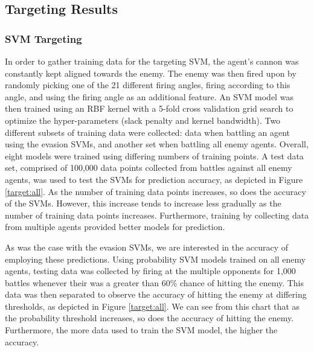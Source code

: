 \documentclass{article}
\theoremstyle{plain}
\theoremstyle{definition}
\theoremstyle{remark}
\begin{document}
\subsection*{Targeting Results}
\subsubsection*{SVM Targeting}
In order to gather training data for the targeting SVM, the agent's cannon was constantly kept aligned towards the enemy. The enemy was then fired upon by randomly picking one of the 21 different firing angles, firing according to this angle, and using the firing angle as an additional feature. An SVM model was then trained using an RBF kernel with a 5-fold cross validation grid search to optimize the hyper-parameters (slack penalty and kernel bandwidth). Two different subsets of training data were collected: data when battling an agent using the evasion SVMs, and another set when battling all enemy agents. Overall, eight models were trained using differing numbers of training points. A test data set, comprised of 100,000 data points collected from battles against all enemy agents, was used to test the SVMs for prediction accuracy, as depicted in Figure \ref{target:all}. As the number of training data points increases, so does the accuracy of the SVMs. However, this increase tends to increase less gradually as the number of training data points increases. Furthermore, training by collecting data from multiple agents provided better models for prediction. 

As was the case with the evasion SVMs, we are interested in the accuracy of employing these predictions. Using probability SVM models trained on all enemy agents, testing data was collected by firing at the multiple opponents for 1,000 battles whenever their was a greater than 60\% chance of hitting the enemy. This data was then separated to observe the accuracy of hitting the enemy at differing thresholds, as depicted in Figure \ref{target:all}. We can see from this chart that as the probability threshold increases, so does the accuracy of hitting the enemy. Furthermore, the more data used to train the SVM model, the higher the accuracy. 
\end{document}
